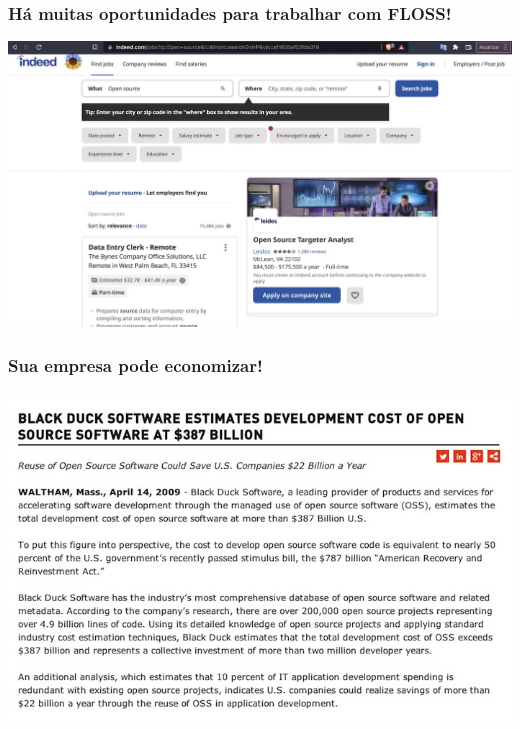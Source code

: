 \documentclass[xcolor=dvipsnames]{beamer}
\begin{document}
\begin{frame}
	\frametitle{Há muitas oportunidades para trabalhar com FLOSS!}
 	\includegraphics[scale=0.25]{oss_jobs2.jpg}
\end{frame}

\begin{frame}
	\frametitle{Sua empresa pode economizar!}
 	\includegraphics[scale=0.45]{economia.jpg}	
\end{frame}
\end{document}

